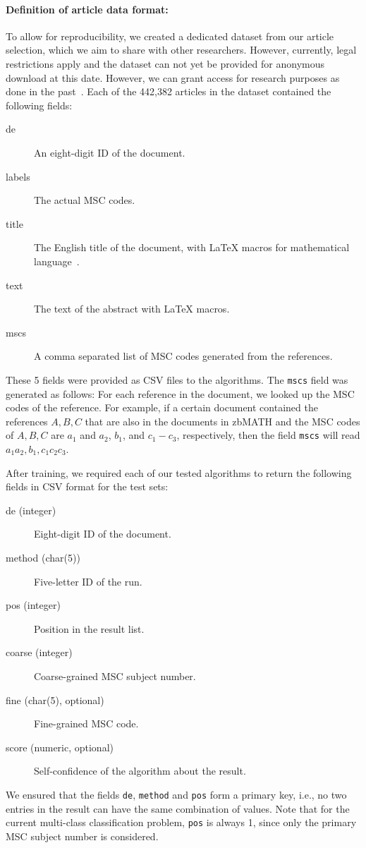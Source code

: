 \paragraph{Definition of article data format:}
To allow for reproducibility, we created a dedicated dataset from our article selection, which we aim to share with other researchers.
However, currently, legal restrictions apply and the dataset can not yet be provided for anonymous download at this date.
However, we can grant access for research purposes as done in the past~\cite{BarthelTB13}.
Each of the 442,382 articles in the dataset contained the following fields:
\begin{description}
  \item[de] An eight-digit ID of the document\footnotemark.
  \item[labels] The actual MSC codes\footnotemark[\value{footnote}].
  \item[title] The English title of the document, with LaTeX macros for mathematical language~\cite{Schubotz2019b}.
  \item[text] The text of the abstract with LaTeX macros.
  \item[mscs] A comma separated list of MSC codes generated from the references.
\end{description}
These 5 fields were provided as CSV files to the algorithms. The \texttt{mscs} field was generated as follows: For each reference in the document, we looked up the MSC codes of the reference. For example, if a certain document contained the references \(A,B,C\) that are also in the documents in zbMATH and the MSC codes of \(A,B,C\) are \(a_{1}\) and \(a_{2}\), \(b_{1}\), and \(c_{1} - c_{3}\), respectively, then the field \texttt{mscs} will read \(a_{1}a_{2},b_{1},c_{1}c_{2}c_{3}.\)

After training, we required each of our tested algorithms to return the following fields in CSV format for the test sets:
\begin{description}
  \item[de (integer)] Eight-digit ID of the document.
  \item[method (char(5))] Five-letter ID of the run.
  \item[pos (integer)] Position in the result list.
  \item[coarse (integer)] Coarse-grained MSC subject number.
  \item[fine (char(5), optional)] Fine-grained MSC code.
  \item[score (numeric, optional)] Self-confidence of the algorithm about the result.
\end{description}
We ensured that the fields \texttt{de}, \texttt{method} and \texttt{pos} form a primary key, i.e., no two entries in the result can have the same combination of values.
Note that for the current multi-class classification problem, \texttt{pos} is always 1, since only the primary MSC subject number is considered.
